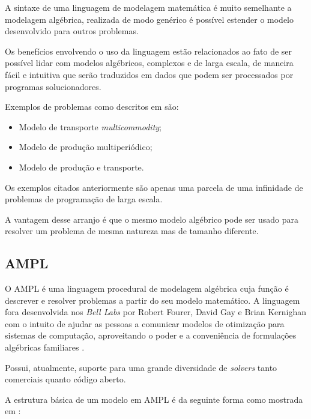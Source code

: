 A sintaxe de uma linguagem de modelagem matemática é muito semelhante a modelagem algébrica, realizada de modo genérico é possível estender o modelo desenvolvido para outros problemas.

Os benefícios envolvendo o uso da linguagem estão relacionados ao fato de ser possível lidar com modelos algébricos, complexos e de larga escala, de maneira fácil e intuitiva que serão traduzidos em dados que podem ser processados por programas solucionadores.

Exemplos de problemas como descritos em \cite{Fourer2003AMPLProgramming} são:

\begin{itemize}
    \item Modelo de transporte \emph{multicommodity};
    
    \item Modelo de produção multiperiódico;
    
    \item Modelo de produção e transporte.
\end{itemize}

Os exemplos citados anteriormente são apenas uma parcela de uma infinidade de problemas de programação de larga escala.

A vantagem desse arranjo é que o mesmo modelo algébrico pode ser usado para resolver um problema de mesma natureza mas de tamanho diferente.

\subsection{AMPL}

O AMPL é uma linguagem procedural de modelagem algébrica cuja função é descrever e resolver problemas a partir do seu modelo matemático. 
A linguagem fora desenvolvida nos \emph{Bell Labs} por Robert Fourer, David Gay e Brian Kernighan com o intuito de ajudar as pessoas a comunicar modelos de otimização para sistemas de computação, aproveitando o poder e a conveniência de formulações algébricas familiares \cite{ampl}. 

Possui, atualmente, suporte para uma grande diversidade de \textit{solvers} tanto comerciais quanto código aberto.

A estrutura básica de um modelo em AMPL é da seguinte forma como mostrada em \cite{taha2008pesquisa}:

